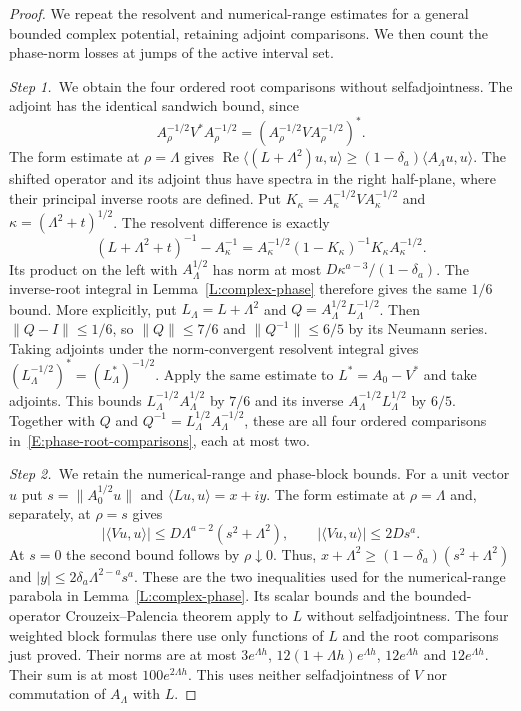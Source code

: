 \documentclass[12pt,oneside,openany]{book}
\numberwithin{equation}{section}
\theoremstyle{nogostyle}
\theoremstyle{definition}
\begin{document}
\begin{proof}
  We repeat the resolvent and numerical-range estimates for a general bounded
  complex potential, retaining adjoint comparisons. We then count the
  phase-norm losses at jumps of the active interval set.


  \medskip
  \noindent\textit{Step 1.~}We obtain the four ordered root comparisons
  without selfadjointness.
  The adjoint has the identical sandwich bound, since
  \[
    A_\rho^{-1/2}V^*A_\rho^{-1/2}
    =(A_\rho^{-1/2}VA_\rho^{-1/2})^*.
  \]
  The form estimate at $\rho = \Lambda$ gives
  $\operatorname{Re}\langle(L+\Lambda^2)u,u\rangle \ge (1-\delta_a)\langle
  A_\Lambda u,u\rangle$. The shifted operator and its adjoint thus have spectra
  in the right half-plane, where their principal inverse roots are defined. Put
  $K_\kappa = A_\kappa^{-1/2}VA_\kappa^{-1/2}$ and $\kappa =
  (\Lambda^2+t)^{1/2}$. The resolvent difference is exactly
  \[
    (L+\Lambda^2+t)^{-1}-A_\kappa^{-1}
    =A_\kappa^{-1/2}(1-K_\kappa)^{-1}K_\kappa A_\kappa^{-1/2}.
  \]
  Its product on the left with $A_\Lambda^{1/2}$ has norm at most
  $D\kappa^{a-3}/(1-\delta_a)$. The inverse-root integral in
  Lemma~\ref{L:complex-phase} therefore gives the same $1/6$ bound. More
  explicitly, put $L_\Lambda = L+\Lambda^2$ and $Q =
  A_\Lambda^{1/2}L_\Lambda^{-1/2}$. Then $\|Q-I\| \le 1/6$, so $\|Q\| \le 7/6$
  and $\|Q^{-1}\| \le 6/5$ by its Neumann series. Taking adjoints under the
  norm-convergent resolvent integral gives $(L_\Lambda^{-1/2})^* =
  (L_\Lambda^*)^{-1/2}$. Apply the same estimate to $L^* = A_0-V^*$ and take
  adjoints. This bounds $L_\Lambda^{-1/2}A_\Lambda^{1/2}$ by $7/6$ and its
  inverse $A_\Lambda^{-1/2}L_\Lambda^{1/2}$ by $6/5$. Together with $Q$ and
  $Q^{-1} = L_\Lambda^{1/2}A_\Lambda^{-1/2}$, these are all four ordered
  comparisons in~\eqref{E:phase-root-comparisons}, each at most two.


  \medskip
  \noindent\textit{Step 2.~}We retain the numerical-range and phase-block
  bounds.
  For a unit vector $u$ put $s = \|A_0^{1/2}u\|$ and $\langle Lu,u\rangle =
  x+iy$. The form estimate at $\rho = \Lambda$ and, separately, at $\rho = s$
  gives
  \[
    |\langle Vu,u\rangle|\le D\Lambda^{a-2}(s^2+\Lambda^2),
    \qquad |\langle Vu,u\rangle|\le2Ds^a.
  \]
  At $s = 0$ the second bound follows by $\rho\downarrow0$. Thus, $x+\Lambda^2
  \ge (1-\delta_a)(s^2+\Lambda^2)$ and $|y| \le 2\delta_a\Lambda^{2-a}s^a$.
  These are the two inequalities used for the numerical-range parabola in
  Lemma~\ref{L:complex-phase}. Its scalar bounds and the bounded-operator
  Crouzeix--Palencia theorem apply to $L$ without selfadjointness. The four
  weighted block formulas there use only functions of $L$ and the root
  comparisons just proved. Their norms are at most $3e^{\Lambda h}$,
  $12(1+\Lambda h)e^{\Lambda h}$, $12e^{\Lambda h}$ and $12e^{\Lambda h}$. Their
  sum is at most $100e^{2\Lambda h}$. This uses neither selfadjointness of $V$
  nor commutation of $A_\Lambda$ with $L$.



\end{proof}
\end{document}
